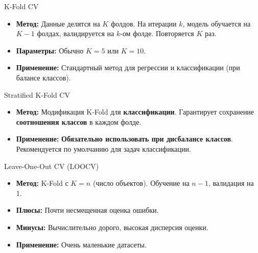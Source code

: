 \begin{myexampleblock}{K-Fold CV}
\begin{itemize}[nosep, leftmargin=*]
    \item \textbf{Метод:} Данные делятся на $K$ фолдов. На итерации $k$, модель обучается на $K-1$ фолдах, валидируется на $k$-ом фолде. Повторяется $K$ раз.
    \item \textbf{Параметры:} Обычно $K=5$ или $K=10$.
    \item \textbf{Применение:} Стандартный метод для регрессии и классификации (при балансе классов).
\end{itemize}
\end{myexampleblock}

\begin{myexampleblock}{Stratified K-Fold CV}
\begin{itemize}[nosep, leftmargin=*]
    \item \textbf{Метод:} Модификация K-Fold для \textbf{классификации}. Гарантирует сохранение \textbf{соотношения классов} в каждом фолде.
    \item \textbf{Применение:} \textbf{Обязательно использовать при дисбалансе классов}. Рекомендуется по умолчанию для задач классификации.
\end{itemize}
\end{myexampleblock}

\begin{myexampleblock}{{Leave-One-Out CV (LOOCV)}}
    \begin{itemize}[nosep, leftmargin=*]
        \item \textbf{Метод:} K-Fold с $K=n$ (число объектов). Обучение на $n-1$, валидация на 1.
        \item \textbf{Плюсы:} Почти несмещенная оценка ошибки.
        \item \textbf{Минусы:} Вычислительно дорого, высокая дисперсия оценки.
        \item \textbf{Применение:} Очень маленькие датасеты.
    \end{itemize}
\end{myexampleblock}


